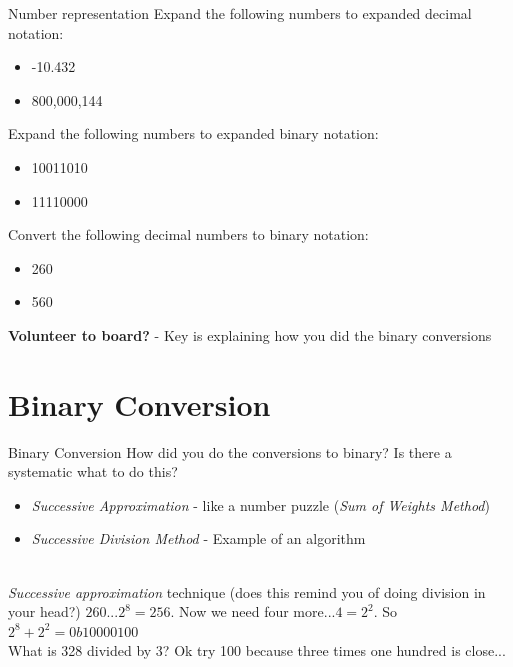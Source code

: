 \documentclass{beamer}
\begin{document}
\begin{frame}{Number representation}
Expand the following numbers to expanded decimal notation:
\begin{itemize}
\item -10.432
\item 800,000,144
\end{itemize}
Expand the following numbers to expanded binary notation:
\begin{itemize}
\item 10011010
\item 11110000
\end{itemize}
Convert the following decimal numbers to binary notation:
\begin{itemize}
\item 260
\item 560
\end{itemize}
\textbf{Volunteer to board?} - Key is explaining how you did the binary conversions
\end{frame}

\section{Binary Conversion}

\begin{frame}{Binary Conversion}
How did you do the conversions to binary?  Is there a systematic what to do this? \\
\begin{itemize}
\item \textit{Successive Approximation} - like a number puzzle (\textit{Sum of Weights Method})
\item \textit{Successive Division Method} - Example of an algorithm
\end{itemize}
\hrulefill \\ \vspace{0.5cm}
\textit{Successive approximation} technique (does this remind you of doing division in your head?)
$260$...$2^8 = 256$.  Now we need four more...$4 = 2^2$.  So $2^8 + 2^2 = 0b10000100$ \\ \vspace{0.5cm}
What is 328 divided by 3?  Ok try 100 because three times one hundred is close...
\end{frame}
\end{document}

